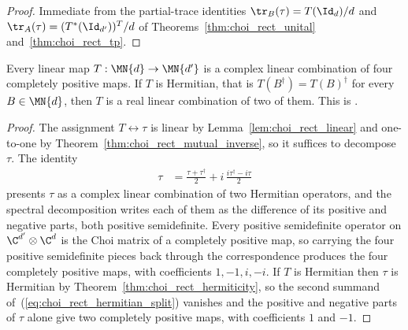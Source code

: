 \begin{proof}
    \leanok
    Immediate from the partial-trace identities
    $\tr_B(\tau)=T(\Id_d)/d$ and $\tr_A(\tau)=(T^*(\Id_{d'}))^{T}/d$ of
    Theorems~\ref{thm:choi_rect_unital} and~\ref{thm:choi_rect_tp}.
\end{proof}

\begin{theorem}
    \label{thm:choi_rect_cp_decomposition}
    \leanok
    Every linear map $T:\MN{d}\to\MN{d'}$ is a complex linear combination of
    four completely positive maps. If $T$ is Hermitian, that is
    $T(B^\dagger)=T(B)^\dagger$ for every $B\in\MN{d}$, then $T$ is a real
    linear combination of two of them. This is
    \cite[Proposition~2.2]{Wolf2012Quantum}.
\end{theorem}

\begin{proof}
    \leanok
    The assignment $T\leftrightarrow\tau$ is linear by
    Lemma~\ref{lem:choi_rect_linear} and one-to-one by
    Theorem~\ref{thm:choi_rect_mutual_inverse}, so it suffices to decompose
    $\tau$. The identity
    \begin{align}
        \tau
          &= \frac{\tau+\tau^\dagger}{2}
             + i\,\frac{i\tau^\dagger-i\tau}{2}
        \label{eq:choi_rect_hermitian_split}
    \end{align}
    presents $\tau$ as a complex linear combination of two Hermitian
    operators, and the spectral decomposition writes each of them as the
    difference of its positive and negative parts, both positive
    semidefinite. Every positive semidefinite operator on
    $\C^{d'}\otimes\C^{d}$ is the Choi matrix of a completely positive map, so
    carrying the four positive semidefinite pieces back through the
    correspondence produces the four completely positive maps, with
    coefficients $1,-1,i,-i$. If $T$ is Hermitian then $\tau$ is Hermitian by
    Theorem~\ref{thm:choi_rect_hermiticity}, so the second summand
    of~(\ref{eq:choi_rect_hermitian_split}) vanishes and the positive and
    negative parts of $\tau$ alone give two completely positive maps, with
    coefficients $1$ and $-1$.
\end{proof}

